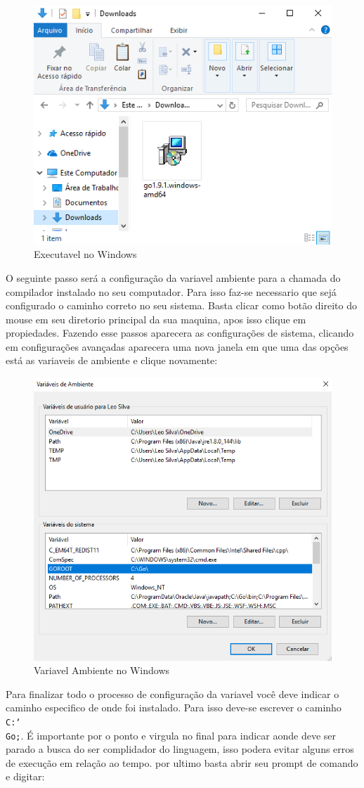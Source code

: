 \documentclass{SBCbookchapter}
\begin{document}
\begin{figure}[h]
	\centering
	\includegraphics[width=0.5\linewidth]{diretorio.png}
	\caption{Executavel no Windows}
	\label{fig:gf}
\end{figure}

O seguinte passo será a configuração da variavel ambiente para a chamada do compilador instalado no seu computador. Para isso faz-se necessario que sejá configurado o caminho correto no seu sistema. Basta clicar como botão direito do mouse em seu diretorio principal da sua maquina, apos isso clique em propiedades. Fazendo esse passos aparecera as configurações de sistema, clicando em configurações avançadas aparecera uma nova janela em que uma das opções está as variaveis de ambiente e clique novamente:

\begin{figure}[h]
	\centering
	\includegraphics[width=0.5\linewidth]{ambiente.png}
	\caption{Variavel Ambiente no Windows}
	\label{fig:gf}
\end{figure}

Para finalizar todo o processo de configuração da variavel você deve indicar o caminho especifico de onde foi instalado. Para isso deve-se escrever o caminho \texttt{C:\char`\\Go;}. É importante por o ponto e virgula no final para indicar aonde deve ser parado a busca do ser complidador do linguagem, isso podera evitar alguns erros de execução em relação ao tempo. por ultimo basta abrir seu prompt de comando e digitar:
\end{document}
